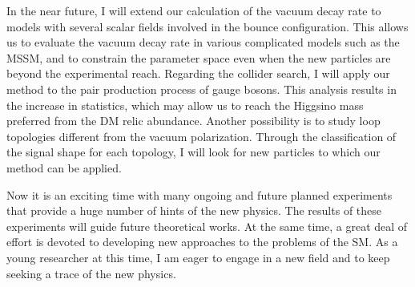 \documentclass[12pt,notitlepage]{article}
\begin{document}
In the near future, I will extend our calculation of the vacuum decay rate to models with several scalar fields involved in the bounce configuration.
This allows us to evaluate the vacuum decay rate in various complicated models such as the MSSM, and to constrain the parameter space even when the new particles are beyond the experimental reach.
Regarding the collider search, I will apply our method to the pair production process of gauge bosons.
This analysis results in the increase in statistics, which may allow us to reach the Higgsino mass preferred from the DM relic abundance.
Another possibility is to study loop topologies different from the vacuum polarization.
Through the classification of the signal shape for each topology, I will look for new particles to which our method can be applied.

Now it is an exciting time with many ongoing and future planned experiments that provide a huge number of hints of the new physics.
The results of these experiments will guide future theoretical works.
At the same time, a great deal of effort is devoted to developing new approaches to the problems of the SM.
As a young researcher at this time, I am eager to engage in a new field and to keep seeking a trace of the new physics.
\end{document}
